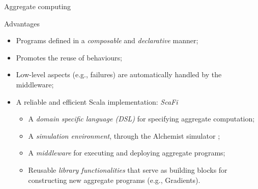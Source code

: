 \documentclass[presentation]{beamer}\mode<presentation>{\usetheme{AMSBolognaFC}}
\begin{document}
\begin{frame}[allowframebreaks]{Aggregate computing}
\begin{alertblock}{Advantages}
	\begin{itemize}
		\item Programs defined in a \emph{composable} and \emph{declarative} manner;
		\item Promotes the reuse of behaviours;
		\item Low-level aspects (e.g., failures) are automatically handled by the middleware;
		\item A reliable and efficient Scala implementation: \emph{ScaFi} \cite{casadei2022scafi}
		\begin{itemize}
			\item A \emph{domain specific language (DSL)} for specifying aggregate computation;
			\item A \emph{simulation environment}, through the Alchemist simulator \cite{alchemist};
			\item A \emph{middleware} for executing and deploying aggregate programs;
			\item Reusable \emph{library functionalities} that serve as building blocks for constructing new aggregate
			programs (e.g., Gradients).
		\end{itemize}
	\end{itemize}
\end{alertblock}
	
\end{frame}
\end{document}
